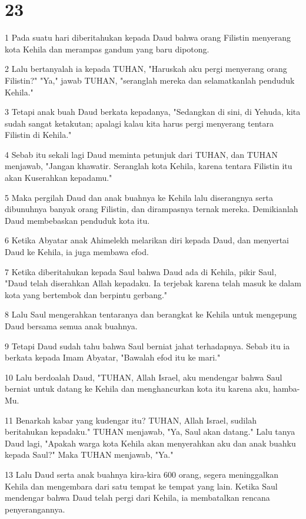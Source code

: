 \chapter{23}

\par 1 Pada suatu hari diberitahukan kepada Daud bahwa orang Filistin menyerang kota Kehila dan merampas gandum yang baru dipotong.
\par 2 Lalu bertanyalah ia kepada TUHAN, "Haruskah aku pergi menyerang orang Filistin?" "Ya," jawab TUHAN, "seranglah mereka dan selamatkanlah penduduk Kehila."
\par 3 Tetapi anak buah Daud berkata kepadanya, "Sedangkan di sini, di Yehuda, kita sudah sangat ketakutan; apalagi kalau kita harus pergi menyerang tentara Filistin di Kehila."
\par 4 Sebab itu sekali lagi Daud meminta petunjuk dari TUHAN, dan TUHAN menjawab, "Jangan khawatir. Seranglah kota Kehila, karena tentara Filistin itu akan Kuserahkan kepadamu."
\par 5 Maka pergilah Daud dan anak buahnya ke Kehila lalu diserangnya serta dibunuhnya banyak orang Filistin, dan dirampasnya ternak mereka. Demikianlah Daud membebaskan penduduk kota itu.
\par 6 Ketika Abyatar anak Ahimelekh melarikan diri kepada Daud, dan menyertai Daud ke Kehila, ia juga membawa efod.
\par 7 Ketika diberitahukan kepada Saul bahwa Daud ada di Kehila, pikir Saul, "Daud telah diserahkan Allah kepadaku. Ia terjebak karena telah masuk ke dalam kota yang bertembok dan berpintu gerbang."
\par 8 Lalu Saul mengerahkan tentaranya dan berangkat ke Kehila untuk mengepung Daud bersama semua anak buahnya.
\par 9 Tetapi Daud sudah tahu bahwa Saul berniat jahat terhadapnya. Sebab itu ia berkata kepada Imam Abyatar, "Bawalah efod itu ke mari."
\par 10 Lalu berdoalah Daud, "TUHAN, Allah Israel, aku mendengar bahwa Saul berniat untuk datang ke Kehila dan menghancurkan kota itu karena aku, hamba-Mu.
\par 11 Benarkah kabar yang kudengar itu? TUHAN, Allah Israel, sudilah beritahukan kepadaku." TUHAN menjawab, "Ya, Saul akan datang." Lalu tanya Daud lagi, "Apakah warga kota Kehila akan menyerahkan aku dan anak buahku kepada Saul?" Maka TUHAN menjawab, "Ya."
\par 13 Lalu Daud serta anak buahnya kira-kira 600 orang, segera meninggalkan Kehila dan mengembara dari satu tempat ke tempat yang lain. Ketika Saul mendengar bahwa Daud telah pergi dari Kehila, ia membatalkan rencana penyerangannya.
